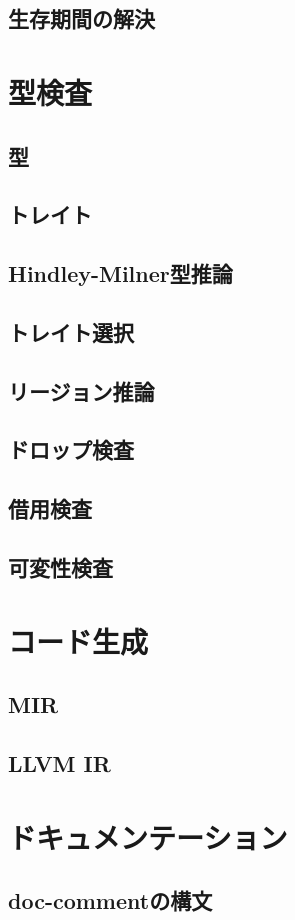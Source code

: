 \documentclass[dvipdfmx,uplatex,papersize,a4paper,10pt]{jsbook}
\theoremstyle{definition}
\begin{document}
\section{生存期間の解決}



\chapter{型検査}

\section{型}

\section{トレイト}

\section{Hindley-Milner型推論}

\section{トレイト選択}

\section{リージョン推論}

\section{ドロップ検査}

\section{借用検査}

\section{可変性検査}



\chapter{コード生成}

\section{MIR}

\section{LLVM IR}



\chapter{ドキュメンテーション}

\section{doc-commentの構文}





\end{document}
